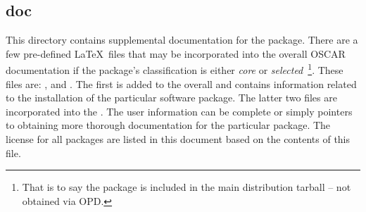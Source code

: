 
\subsection{doc}
\label{sect:pkg-doc}

This directory contains supplemental documentation for the package.  There
are a few pre-defined \LaTeX\ files that may be incorporated into the
overall OSCAR documentation if the package's classification is either
\emph{core} or \emph{selected}~\footnote{That is to say the package is
included in the main distribution tarball -- not obtained via OPD.}.  These
files are: ,  and .  The
first is added to the overall  and contains information
related to the installation of the particular software package.  The latter
two files are incorporated into the .   The user information
can be complete or simply pointers to obtaining more thorough documentation
for the particular package.  The license for all packages are listed in
this document based on the contents of this  file.


